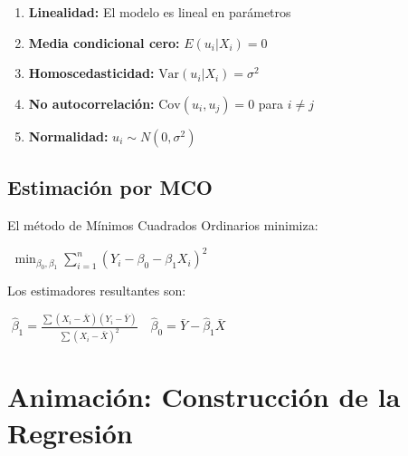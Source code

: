 \documentclass[10pt, spanish]{article}\usepackage[]{graphicx}\usepackage[]{xcolor}
\newcommand{\eqbox}[1]{\colorbox{TitaniumGray}{\,\,$\displaystyle #1$\,\,}}
\begin{document}
\begin{tcolorbox}[colback=TitaniumGray, colframe=NASAClassic, arc=0pt, boxrule=0.5pt, title=SUPUESTOS FUNDAMENTALES]
\small
\begin{enumerate}[leftmargin=15pt, itemsep=2pt]
    \item \textbf{Linealidad:} El modelo es lineal en parámetros
    \item \textbf{Media condicional cero:} $E(u_i|X_i) = 0$
    \item \textbf{Homoscedasticidad:} $\text{Var}(u_i|X_i) = \sigma^2$
    \item \textbf{No autocorrelación:} $\text{Cov}(u_i, u_j) = 0$ para $i \neq j$
    \item \textbf{Normalidad:} $u_i \sim N(0, \sigma^2)$
\end{enumerate}
\end{tcolorbox}

\subsection{Estimación por MCO}

El método de Mínimos Cuadrados Ordinarios minimiza:

\vspace{8pt}
\begin{center}
\eqbox{\min_{\beta_0, \beta_1} \sum_{i=1}^{n} (Y_i - \beta_0 - \beta_1 X_i)^2}
\end{center}
\vspace{8pt}

Los estimadores resultantes son:

\vspace{8pt}
\begin{center}
\eqbox{\hat{\beta}_1 = \frac{\sum (X_i - \bar{X})(Y_i - \bar{Y})}{\sum (X_i - \bar{X})^2}} \quad
\eqbox{\hat{\beta}_0 = \bar{Y} - \hat{\beta}_1 \bar{X}}
\end{center}
\vspace{8pt}

\section{Animación: Construcción de la Regresión}
\end{document}
